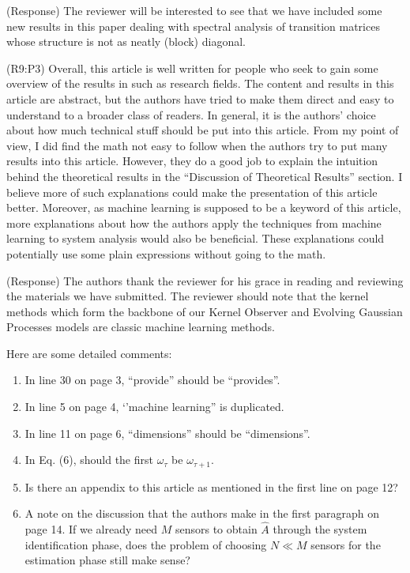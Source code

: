 \documentclass{letter}
\begin{document}
{\color{red}(Response)} The reviewer will be interested to see that we have included some new results in this paper dealing with spectral analysis of transition matrices whose structure is not as neatly (block) diagonal.

{\color{red}(R9:P3)} Overall, this article is well written for people who seek to gain some overview of the results in such as research fields. The content and results in this article are abstract, but the authors have tried to make them direct and easy to understand to a broader class of readers. In general, it is the authors’ choice about how much technical stuff should be put into this article. From my point of view, I did find the math not easy to follow when the authors try to put many results into this article. However, they do a good job to explain the intuition behind the theoretical results in the “Discussion of Theoretical Results” section. I believe more of such explanations could make the presentation of this article better. Moreover, as machine learning is supposed to be a keyword of this article, more explanations about how the authors apply the techniques from machine learning to system analysis would also be beneficial. These explanations could potentially use some plain expressions without going to the math.

{\color{red}(Response)} The authors thank the reviewer for his grace in reading and reviewing the materials we have submitted. The reviewer should note that the kernel methods which form the backbone of our Kernel Observer and Evolving Gaussian Processes models are classic machine learning methods.

Here are some detailed comments:
\begin{enumerate}[(1)]
	\item In line 30 on page 3, “provide” should be “provides”.
	\item In line 5 on page 4, ‘’machine learning” is duplicated.
	\item In line 11 on page 6, “dimensions” should be “dimensions”.
	\item In Eq. (6), should the first $\omega_{\tau}$ be $\omega_{\tau+1}$.
	\item Is there an appendix to this article as mentioned in the first line on page 12?
	\item A note on the discussion that the authors make in the first paragraph on page 14. If we already need $M$ sensors to obtain $\hat{A}$ through the system identification phase, does the problem of choosing $N\ll M$ sensors for the estimation phase still make sense?
\end{enumerate}
\end{document}

